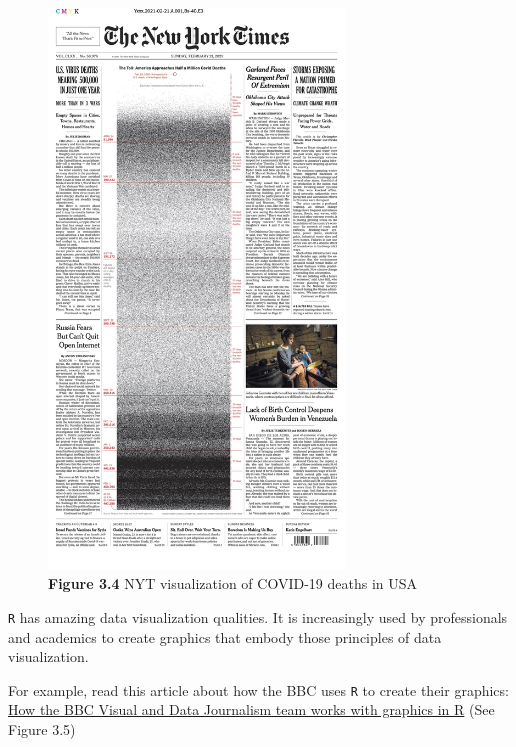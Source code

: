 \documentclass[
]{book}
\begin{document}
\begin{figure}
\centering
\includegraphics[width=0.7\textwidth,height=\textheight]{Images/times_COVID_VIZ.jpeg}
\caption{\textbf{Figure 3.4} NYT visualization of COVID-19 deaths in USA}
\end{figure}

\texttt{R} has amazing data visualization qualities. It is increasingly used by professionals and academics to create graphics that embody those principles of data visualization.

For example, read this article about how the BBC uses \texttt{R} to create their graphics: \href{https://medium.com/bbc-visual-and-data-journalism/how-the-bbc-visual-and-data-journalism-team-works-with-graphics-in-r-ed0b35693535}{How the BBC Visual and Data Journalism team works with graphics in R} (See Figure 3.5)
\end{document}
